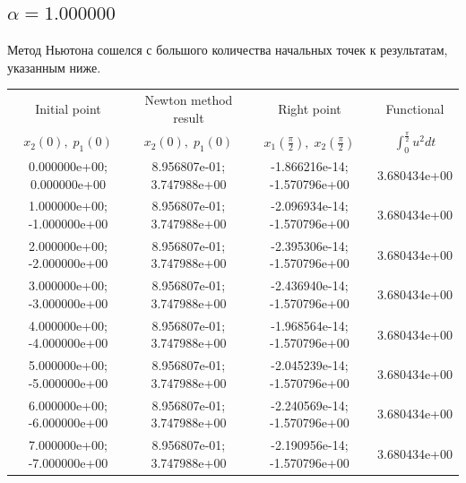 \documentclass[titlepage]{article}
\def\l{\left}
\def\r{\right}
\begin{document}
\subsection{$\alpha = 1.000000$} 
Метод Ньютона сошелся с большого количества начальных точек к результатам, указанным ниже. \\ 
\begin{tabular}{ | c | c | c | c |} 
\hline 
Initial point  & Newton method result & Right point & Functional 
 \\ $x_2(0), \; p_1(0)$ & $x_2(0), \; p_1(0)$ & $x_1\l(\frac{\pi}{2}\r), \; x_2\l(\frac{\pi}{2}\r)$ & $\int_{0}^{\frac{\pi}{2}}u^2dt$  \\ \hline 
0.000000e+00; 0.000000e+00 & 8.956807e-01; 3.747988e+00 & -1.866216e-14; -1.570796e+00 & 3.680434e+00 \\ \hline 
1.000000e+00; -1.000000e+00 & 8.956807e-01; 3.747988e+00 & -2.096934e-14; -1.570796e+00 & 3.680434e+00 \\ \hline 
2.000000e+00; -2.000000e+00 & 8.956807e-01; 3.747988e+00 & -2.395306e-14; -1.570796e+00 & 3.680434e+00 \\ \hline 
3.000000e+00; -3.000000e+00 & 8.956807e-01; 3.747988e+00 & -2.436940e-14; -1.570796e+00 & 3.680434e+00 \\ \hline 
4.000000e+00; -4.000000e+00 & 8.956807e-01; 3.747988e+00 & -1.968564e-14; -1.570796e+00 & 3.680434e+00 \\ \hline 
5.000000e+00; -5.000000e+00 & 8.956807e-01; 3.747988e+00 & -2.045239e-14; -1.570796e+00 & 3.680434e+00 \\ \hline 
6.000000e+00; -6.000000e+00 & 8.956807e-01; 3.747988e+00 & -2.240569e-14; -1.570796e+00 & 3.680434e+00 \\ \hline 
7.000000e+00; -7.000000e+00 & 8.956807e-01; 3.747988e+00 & -2.190956e-14; -1.570796e+00 & 3.680434e+00 \\ \hline 
\end{tabular} 
\end{document}
